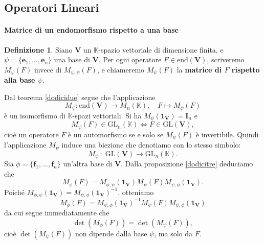 \documentclass{article}
\theoremstyle{plain}
\theoremstyle{definition}
\newtheorem{defn}{Definizione}[section]
\theoremstyle{remark}
\begin{document}
\vspace{50pt}
\subsection{Operatori Lineari}
\vspace{20pt}

\paragraph{Matrice di un endomorfismo rispetto a una base}
\begin{bxthm}
\begin{defn}
Siano \( \mathbf{V} \) un \( \mathbb{K} \)-spazio vettoriale di dimensione finita, e \( \psi = \{\mathbf{e}_1, \ldots, \mathbf{e}_n\} \) una base di \( \mathbf{V} \). 
Per ogni operatore \( F \in \mathrm{end}(\mathbf{V}) \), scriveremo \( M_\psi(F) \) invece di \( M_{\psi,\psi}(F) \), e chiameremo 
\( M_\psi(F) \) la \textbf{matrice di \( F \) rispetto alla base \( \psi \)}.    
\end{defn}
\end{bxthm}

\vspace{10pt}

Dal teorema \ref{dodicidue} segue che l'applicazione
\[M_\psi \colon \mathrm{end}(\mathbf{V}) \to M_n(\mathbb{K}),\quad F \mapsto M_\psi(F)\]
è un isomorfismo di \( \mathbb{K} \)-spazi vettoriali. Si ha $M_\psi(\mathbf{1_V}) = \mathbf{I}_n$ e 
\[ M_\psi(F) \in \mathrm{GL}_n(\mathbb{K})\iff F \in \mathrm{GL}(\mathbf{V}),\]
cioè un operatore \( F \) è un automorfismo se e solo se \( M_\psi(F) \) è invertibile. 
Quindi l'applicazione \( M_\psi \) induce una biezione che denotiamo con lo stesso simbolo:
\[
M_\psi \,:\; \mathrm{GL}(\mathbf{V}) \to \mathrm{GL}_n(\mathbb{K}).
\]
Sia \( \phi = \{\mathbf{f}_1, \ldots, \mathbf{f}_n\} \) un'altra base di \( \mathbf{V} \). 
Dalla proposizione \ref{dodicitre} deduciamo che
\[
M_\phi(F) = M_{\phi,\psi}(\mathbf{1_V}) M_\psi(F) M_{\psi,\phi}(\mathbf{1_V}).
\]
Poiché \( M_{\phi,\psi}(\mathbf{1_V}) = M_{\psi,\phi}(\mathbf{1_V})^{-1} \), otteniamo
\begin{equation}\label{trediciuno}
M_\phi(F) = M_{\psi,\phi}(\mathbf{1_V})^{-1} M_\psi(F) M_{\psi,\phi}(\mathbf{1_V})     
\end{equation}
da cui segue immediatamente che
\[
\det(M_\phi(F)) = \det(M_\psi(F)),
\]
cioè \( \det(M_\psi(F)) \) non dipende dalla base \( \psi \), ma solo da \( F \). 

\vspace{10pt}
\end{document}
